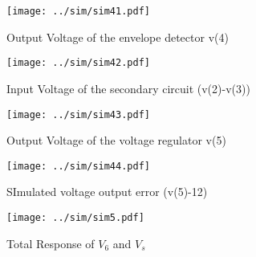 \begin{figure}[H] \centering
\texttt{[image: ../sim/sim41.pdf]}
\caption{Output Voltage of the envelope detector v(4)} 
\label{fig:sim3}
\end{figure}

\begin{figure}[H] \centering
\texttt{[image: ../sim/sim42.pdf]}
\caption{Input Voltage of the secondary circuit (v(2)-v(3))} 
\label{fig:sim3}
\end{figure}

\begin{figure}[H] \centering
\texttt{[image: ../sim/sim43.pdf]}
\caption{Output Voltage of the voltage regulator v(5)} 
\label{fig:sim3}
\end{figure}

\begin{figure}[H] \centering
\texttt{[image: ../sim/sim44.pdf]}
\caption{SImulated voltage output error (v(5)-12)} 
\label{fig:sim3}
\end{figure}


\begin{figure}[H] \centering
\texttt{[image: ../sim/sim5.pdf]}
\caption{Total Response of $V_{6}$ and $V_{s}$}
\label{fig:sim4}
\end{figure}




